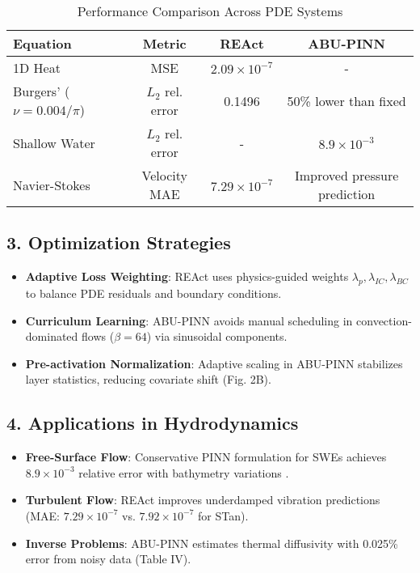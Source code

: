 \begin{table}[h]
\centering
\caption{Performance Comparison Across PDE Systems}
\begin{tabular}{l|c|c|c}
\textbf{Equation} & \textbf{Metric} & \textbf{REAct} & \textbf{ABU-PINN} \\
\hline
1D Heat & MSE & $2.09 \times 10^{-7}$ & - \\
Burgers' ($\nu=0.004/\pi$) & $L_2$ rel. error & 0.1496 & 50\% lower than fixed \\
Shallow Water & $L_2$ rel. error & - & $8.9 \times 10^{-3}$ \\
Navier-Stokes & Velocity MAE & $7.29 \times 10^{-7}$ & Improved pressure prediction \\
\end{tabular}
\end{table}

\subsection*{3. Optimization Strategies}
\begin{itemize}
    \item \textbf{Adaptive Loss Weighting}: REAct uses physics-guided weights $\lambda_p, \lambda_{IC}, \lambda_{BC}$ to balance PDE residuals and boundary conditions.
    \item \textbf{Curriculum Learning}: ABU-PINN avoids manual scheduling in convection-dominated flows ($\beta=64$) via sinusoidal components.
    \item \textbf{Pre-activation Normalization}: Adaptive scaling in ABU-PINN stabilizes layer statistics, reducing covariate shift (Fig. 2B).
\end{itemize}

\subsection*{4. Applications in Hydrodynamics}
\begin{itemize}
    \item \textbf{Free-Surface Flow}: Conservative PINN formulation for SWEs achieves $8.9 \times 10^{-3}$ relative error with bathymetry variations \cite{shallow_water}.
    \item \textbf{Turbulent Flow}: REAct improves underdamped vibration predictions (MAE: $7.29 \times 10^{-7}$ vs. $7.92 \times 10^{-7}$ for STan).
    \item \textbf{Inverse Problems}: ABU-PINN estimates thermal diffusivity with 0.025\% error from noisy data (Table IV).
\end{itemize}

